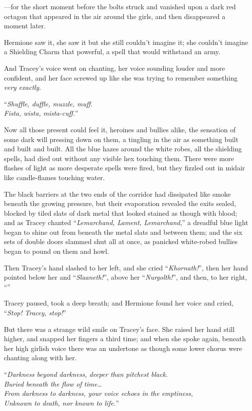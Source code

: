 —for the short moment before the bolts struck and vanished upon a dark red octagon that appeared in the air around the girls, and then disappeared a moment later.

Hermione saw it, she saw it but she still couldn’t imagine it; she couldn’t imagine a Shielding Charm that powerful, a spell that would withstand an army.

And Tracey’s voice went on chanting, her voice sounding louder and more confident, and her face screwed up like she was trying to remember something \emph{very exactly}.

“\emph{Shuffle, duffle, muzzle, muff.\\
Fista, wista, mista-cuff.}”

Now all those present could feel it, heroines and bullies alike, the sensation of some dark will pressing down on them, a tingling in the air as something built and built and built. All the blue hazes around the white robes, all the shielding spells, had died out without any visible hex touching them. There were more flashes of light as more desperate spells were fired, but they fizzled out in midair like candle-flames touching water.

The black barriers at the two ends of the corridor had dissipated like smoke beneath the growing pressure, but their evaporation revealed the exits sealed, blocked by tiled slats of dark metal that looked stained as though with blood; and as Tracey chanted “\emph{Lemarchand, Lament, Lemarchand},” a dreadful blue light began to shine out from beneath the metal slats and between them; and the six sets of double doors slammed shut all at once, as panicked white-robed bullies began to pound on them and howl.

Then Tracey’s hand slashed to her left, and she cried “\emph{Khornath!}”, then her hand pointed below her and “\emph{Slaaneth!}”, above her “\emph{Nurgolth!}”, and then, to her right, “”

Tracey paused, took a deep breath; and Hermione found her voice and cried, “\emph{Stop! Tracey, stop!}”

But there was a strange wild smile on Tracey’s face. She raised her hand still higher, and snapped her fingers a third time; and when she spoke again, beneath her high girlish voice there was an undertone as though some lower chorus were chanting along with her.

“\emph{Darkness beyond darkness, deeper than pitchest black.\\
Buried beneath the flow of time…\\
From darkness to darkness, your voice echoes in the emptiness,\\
Unknown to death, nor known to life.}”

